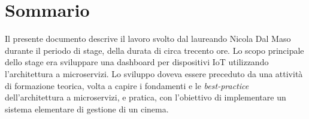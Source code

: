 
\cleardoublepage
{}
{}
\begingroup
\let\clearpage\relax
\let\cleardoublepage\relax
\let\cleardoublepage\relax

\chapter*{Sommario}

Il presente documento descrive il lavoro svolto dal laureando Nicola Dal Maso durante il periodo di stage, della durata di circa trecento ore.
Lo scopo principale dello stage era sviluppare una dashboard per dispositivi IoT utilizzando l'architettura a microservizi.
Lo sviluppo doveva essere preceduto da una attività di formazione teorica, 
volta a capire i fondamenti e le \textit{best-practice} dell'architettura a microservizi, 
e pratica, con l'obiettivo di implementare un sistema elementare di gestione di un cinema. 


%
%

\endgroup			

\vfill

